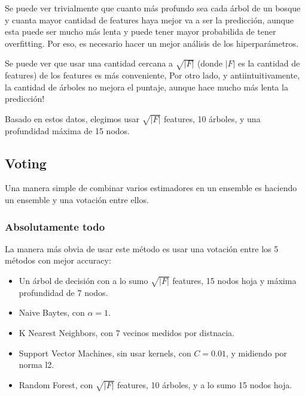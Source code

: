 \documentclass{article}
\begin{document}
Se puede ver trivialmente que cuanto más profundo sea cada árbol de un bosque y cuanta mayor cantidad de features haya mejor va a ser la predicción, aunque esta puede ser mucho más lenta y puede tener mayor probabilida de tener overfitting. Por eso, es necesario hacer un mejor análisis de los hiperparámetros.


Se puede ver que usar una cantidad cercana a \( \sqrt{\left|F\right|} \) (donde \(\left|F\right|\) es la cantidad de features) de los features es más conveniente, Por otro lado, y antiintuitivamente, la cantidad de árboles no mejora el puntaje, aunque hace mucho más lenta la predicción!

Basado en estos datos, elegimos usar \( \sqrt{|F|} \) features, 10 árboles, y una profundidad máxima de 15 nodos.

\subsection{Voting}

Una manera simple de combinar varios estimadores en un ensemble es haciendo un ensemble y una votación entre ellos.

\subsubsection{Absolutamente todo}

La manera más obvia de usar este método es usar una votación entre los 5 métodos con mejor accuracy:

\begin{itemize}
	\item Un árbol de decisión con a lo sumo \( \sqrt{\left|F\right|} \) features, 15 nodos hoja y máxima profundidad de 7 nodos.
	\item Naive Baytes, con \( \alpha = 1 \).
	\item K Nearest Neighbors, con 7 vecinos medidos por distnacia.
	\item Support Vector Machines, sin usar kernels, con \( C = 0.01 \), y midiendo por norma l2.
	\item Random Forest, con \( \sqrt{\left|F\right|} \) features, 10 árboles, y a lo sumo 15 nodos hoja.
\end{itemize}
\end{document}

